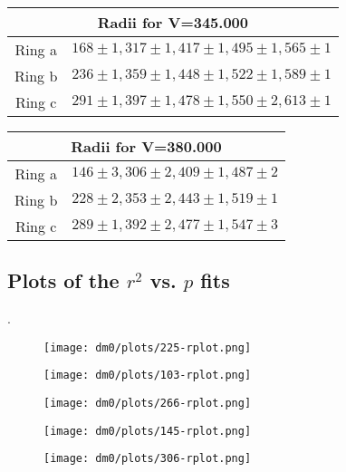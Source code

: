 \documentclass{amsart}
\begin{document}
\begin{tabular}{|c|c|}
\hline
\multicolumn{2}{|c|}{Radii for V=345.000}\\
\hline
Ring a & $168\pm1, 317\pm1, 417\pm1, 495\pm1, 565\pm1$\\
Ring b & $236\pm1, 359\pm1, 448\pm1, 522\pm1, 589\pm1$\\
Ring c & $291\pm1, 397\pm1, 478\pm1, 550\pm2, 613\pm1$\\
\hline
\end{tabular}
\vspace{10pt}

\begin{tabular}{|c|c|}
\hline
\multicolumn{2}{|c|}{Radii for V=380.000}\\
\hline
Ring a & $146\pm3, 306\pm2, 409\pm1, 487\pm2$\\
Ring b & $228\pm2, 353\pm2, 443\pm1, 519\pm1$\\
Ring c & $289\pm1, 392\pm2, 477\pm1, 547\pm3$\\
\hline
\end{tabular}
\vspace{10pt}
\subsection{Plots of the $r^2$ vs. $p$ fits}
.

\begin{figure}
\centering
\texttt{[image: dm0/plots/225-rplot.png]}
\end{figure}
\vspace{10pt}

\begin{figure}
\centering
\texttt{[image: dm0/plots/103-rplot.png]}
\end{figure}
\vspace{10pt}

\begin{figure}
\centering
\texttt{[image: dm0/plots/266-rplot.png]}
\end{figure}
\vspace{10pt}

\begin{figure}
\centering
\texttt{[image: dm0/plots/145-rplot.png]}
\end{figure}
\vspace{10pt}

\begin{figure}
\centering
\texttt{[image: dm0/plots/306-rplot.png]}
\end{figure}
\vspace{10pt}
\end{document}
